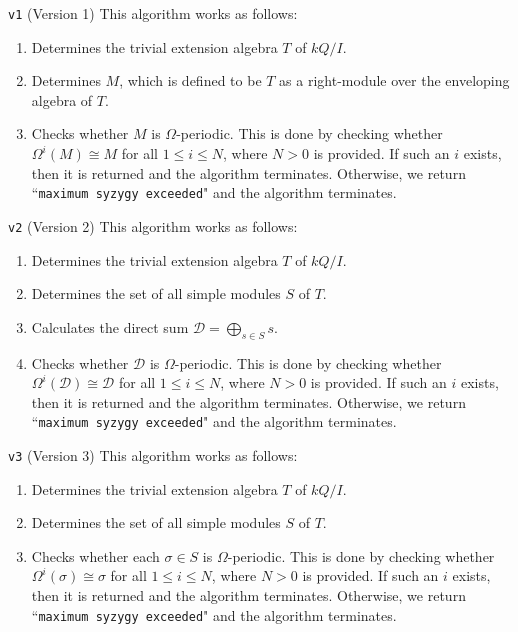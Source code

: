 \documentclass{article}
\begin{document}
\begin{flushleft}
   \begin{coolbox}{\texttt{v1} (Version 1)}
      This algorithm works as follows:
      \begin{enumerate}[label=\textbf{(\roman*)}]
         \item Determines the trivial extension algebra $T$ of $kQ/I$.
         \item Determines $M$, which is defined to be $T$ as a right-module over the enveloping algebra of $T$.
         \item Checks whether $M$ is $\Omega$-periodic. This is done by checking whether $\Omega^i\left(M\right) \cong M$
            for all $1 \leq i \leq N$, where $N > 0$ is provided. If such an $i$ exists, then it is returned and the algorithm
            terminates. Otherwise, we return ``\texttt{maximum syzygy exceeded}" and the algorithm terminates. 
      \end{enumerate}
   \end{coolbox}

   \begin{coolbox}{\texttt{v2} (Version 2)}
      This algorithm works as follows:
      \begin{enumerate}[label=\textbf{(\roman*)}]
         \item Determines the trivial extension algebra $T$ of $kQ/I$.
         \item Determines the set of all simple modules $S$ of $T$.
         \item Calculates the direct sum $\mathcal{D} = \displaystyle \bigoplus_{s \in S} s.$
         \item Checks whether $\mathcal{D}$ is $\Omega$-periodic. This is done by checking whether 
            $\Omega^i\left(\mathcal{D}\right) \cong \mathcal{D}$
            for all $1 \leq i \leq N$, where $N > 0$ is provided. If such an $i$ exists, then it is returned and the algorithm
            terminates. Otherwise, we return ``\texttt{maximum syzygy exceeded}" and the algorithm terminates. 
      \end{enumerate}
   \end{coolbox}

   \begin{coolbox}{\texttt{v3} (Version 3)}
      This algorithm works as follows:
      \begin{enumerate}[label=\textbf{(\roman*)}]
         \item Determines the trivial extension algebra $T$ of $kQ/I$.
         \item Determines the set of all simple modules $S$ of $T$.
         \item Checks whether each $\sigma \in S$ is $\Omega$-periodic. This is done by checking whether 
            $\Omega^i\left(\sigma \right) \cong \sigma$
            for all $1 \leq i \leq N$, where $N > 0$ is provided. If such an $i$ exists, then it is returned and the algorithm
            terminates. Otherwise, we return ``\texttt{maximum syzygy exceeded}" and the algorithm terminates. 
      \end{enumerate}
   \end{coolbox}


\end{flushleft}
\end{document}
